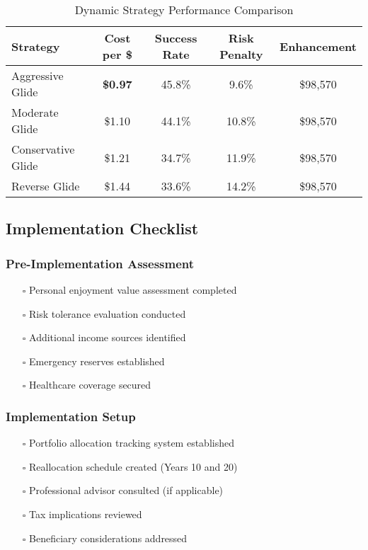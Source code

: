 \documentclass[11pt,letterpaper]{article}
\begin{document}
\begin{table}[H]
\centering
\begin{tabular}{@{}lcccc@{}}
\toprule
\textbf{Strategy} & \textbf{Cost per \$} & \textbf{Success Rate} & \textbf{Risk Penalty} & \textbf{Enhancement} \\
\midrule
Aggressive Glide & \textbf{\$0.97} & 45.8\% & 9.6\% & \$98,570 \\
Moderate Glide & \$1.10 & 44.1\% & 10.8\% & \$98,570 \\
Conservative Glide & \$1.21 & 34.7\% & 11.9\% & \$98,570 \\
Reverse Glide & \$1.44 & 33.6\% & 14.2\% & \$98,570 \\
\bottomrule
\end{tabular}
\caption{Dynamic Strategy Performance Comparison}
\label{tab:dynamic-performance}
\end{table}

\subsection{Implementation Checklist}

\subsubsection{Pre-Implementation Assessment}
\begin{itemize}[leftmargin=*]
    \item[$\square$] Personal enjoyment value assessment completed
    \item[$\square$] Risk tolerance evaluation conducted  
    \item[$\square$] Additional income sources identified
    \item[$\square$] Emergency reserves established
    \item[$\square$] Healthcare coverage secured
\end{itemize}

\subsubsection{Implementation Setup}
\begin{itemize}[leftmargin=*]
    \item[$\square$] Portfolio allocation tracking system established
    \item[$\square$] Reallocation schedule created (Years 10 and 20)
    \item[$\square$] Professional advisor consulted (if applicable)
    \item[$\square$] Tax implications reviewed
    \item[$\square$] Beneficiary considerations addressed
\end{itemize}
\end{document}
